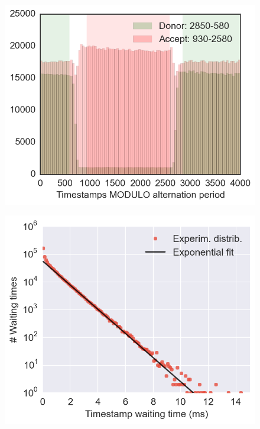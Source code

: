 

\usepackage[utf8]{inputenc}
\usepackage[LGR,T1]{fontenc}
\usepackage{textcomp}

\usepackage{fancyref}
\usepackage{hyperref}
\usepackage{cite}

\makeatletter
\newcommand{\verbatimfont}[1]{\renewcommand{\verbatim@font}{\ttfamily#1}}
\makeatother

\author{Antonino Ingargiola}
\title{}



\verbatimfont{\small}

\maketitle

\begin{abstract}

\end{abstract}

\tableofcontents





\begin{figure}
\begin{center}
\includegraphics[width=0.6\columnwidth]{"figures/usALEX_alternation_hist/usALEX_alternation_hist"}
\caption[]{}
\end{center}
\end{figure}



\begin{figure}
\begin{center}
\includegraphics[width=0.6\columnwidth]{"figures/ph_delays_distrib1/ph_delays_distrib1"}
\caption[]{}
\end{center}
\end{figure}

